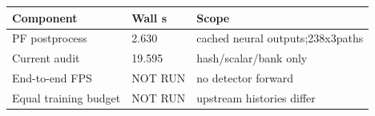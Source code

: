 \begin{tabular}{lll}
\hline
Component & Wall s & Scope \\
\hline
PF postprocess & 2.630 & cached neural outputs;238x3paths \\
Current audit & 19.595 & hash/scalar/bank only \\
End-to-end FPS & NOT RUN & no detector forward \\
Equal training budget & NOT RUN & upstream histories differ \\
\hline
\end{tabular}
